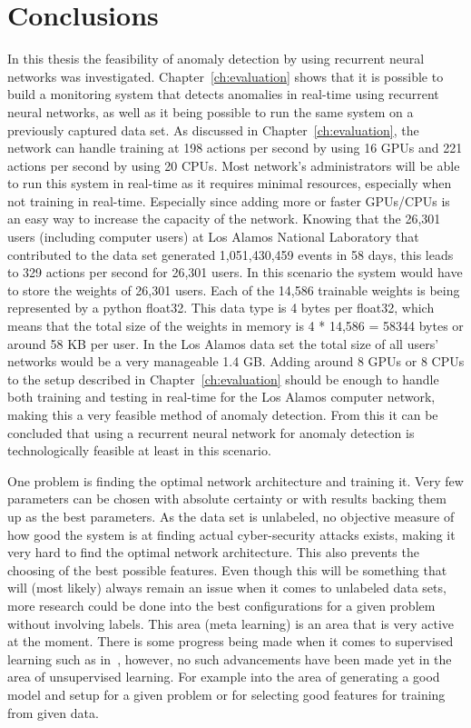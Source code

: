 \chapter{Conclusions}\label{ch:conclusions}

In this thesis the feasibility of anomaly detection by using recurrent neural networks was investigated. Chapter~\ref{ch:evaluation} shows that it is possible to build a monitoring system that detects anomalies in real-time using recurrent neural networks, as well as it being possible to run the same system on a previously captured data set. As discussed in Chapter~\ref{ch:evaluation}, the network can handle training at 198 actions per second by using 16 GPUs and 221 actions per second by using 20 CPUs. Most network's administrators will be able to run this system in real-time as it requires minimal resources, especially when not training in real-time. Especially since adding more or faster GPUs/CPUs is an easy way to increase the capacity of the network. Knowing that the 26,301 users (including computer users) at Los Alamos National Laboratory that contributed to the data set generated 1,051,430,459 events in 58 days, this leads to 329 actions per second for 26,301 users. In this scenario the system would have to store the weights of 26,301 users. Each of the 14,586 trainable weights is being represented by a python float32. This data type is 4 bytes per float32, which means that the total size of the weights in memory is 4 * 14,586 = 58344 bytes or around 58 KB per user. In the Los Alamos data set the total size of all users' networks would be a very manageable 1.4 GB. Adding around 8 GPUs or 8 CPUs to the setup described in Chapter~\ref{ch:evaluation} should be enough to handle both training and testing in real-time for the Los Alamos computer network, making this a very feasible method of anomaly detection. From this it can be concluded that using a recurrent neural network for anomaly detection is technologically feasible at least in this scenario. 

One problem is finding the optimal network architecture and training it. Very few parameters can be chosen with absolute certainty or with results backing them up as the best parameters. As the data set is unlabeled, no objective measure of how good the system is at finding actual cyber-security attacks exists, making it very hard to find the optimal network architecture. This also prevents the choosing of the best possible features. Even though this will be something that will (most likely) always remain an issue when it comes to unlabeled data sets, more research could be done into the best configurations for a given problem without involving labels. This area (meta learning) is an area that is very active at the moment. There is some progress being made when it comes to supervised learning such as in~\cite{zoph2016neural}, however, no such advancements have been made yet in the area of unsupervised learning. For example into the area of generating a good model and setup for a given problem or for selecting good features for training from given data.

